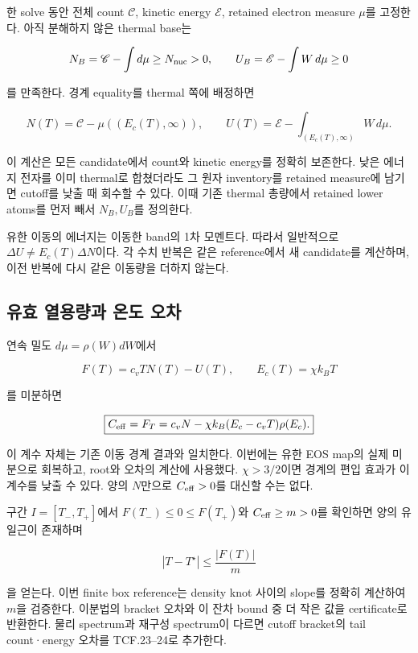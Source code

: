\documentclass[11pt,a4paper]{article}
\begin{document}
한 solve 동안 전체 count \(\mathscr C\), kinetic energy \(\mathscr E\), retained electron measure \(\mu\)를 고정한다. 아직 분해하지 않은 thermal base는

\[
N_B=\mathscr C-\int d\mu\ge N_{\rm nuc}>0,\qquad
U_B=\mathscr E-\int W\,d\mu\ge0
\]

를 만족한다. 경계 equality를 thermal 쪽에 배정하면

\[
\boxed{N(T)=\mathscr C-\mu((E_c(T),\infty)),\qquad
U(T)=\mathscr E-\int_{(E_c(T),\infty)}W\,d\mu.}
\]

이 계산은 모든 candidate에서 count와 kinetic energy를 정확히 보존한다. 낮은 에너지 전자를 이미 thermal로 합쳤더라도 그 원자 inventory를 retained measure에 남기면 cutoff를 낮출 때 회수할 수 있다. 이때 기존 thermal 총량에서 retained lower atoms를 먼저 빼서 \(N_B,U_B\)를 정의한다.

유한 이동의 에너지는 이동한 band의 1차 모멘트다. 따라서 일반적으로 \(\Delta U\ne E_c(T)\Delta N\)이다. 각 수치 반복은 같은 reference에서 새 candidate를 계산하며, 이전 반복에 다시 같은 이동량을 더하지 않는다.

\hypertarget{uxc720uxd6a8-uxc5f4uxc6a9uxb7c9uxacfc-uxc628uxb3c4-uxc624uxcc28}{%
\subsection{유효 열용량과 온도 오차}\label{uxc720uxd6a8-uxc5f4uxc6a9uxb7c9uxacfc-uxc628uxb3c4-uxc624uxcc28}}

연속 밀도 \(d\mu=\rho(W)dW\)에서

\[
F(T)=c_vTN(T)-U(T),\qquad E_c(T)=\chi k_BT
\]

를 미분하면

\[
\boxed{C_{\rm eff}=F_T=c_vN-\chi k_B(E_c-c_vT)\rho(E_c).}
\]

이 계수 자체는 기존 이동 경계 결과와 일치한다. 이번에는 유한 EOS map의 실제 미분으로 회복하고, root와 오차의 계산에 사용했다. \(\chi>3/2\)이면 경계의 편입 효과가 이 계수를 낮출 수 있다. 양의 \(N\)만으로 \(C_{\rm eff}>0\)를 대신할 수는 없다.

구간 \(I=[T_-,T_+]\)에서 \(F(T_-)\le0\le F(T_+)\)와 \(C_{\rm eff}\ge m>0\)를 확인하면 양의 유일근이 존재하며

\[
\boxed{|T-T^\star|\le\frac{|F(T)|}{m}}
\]

을 얻는다. 이번 finite box reference는 density knot 사이의 slope를 정확히 계산하여 \(m\)을 검증한다. 이분법의 bracket 오차와 이 잔차 bound 중 더 작은 값을 certificate로 반환한다. 물리 spectrum과 재구성 spectrum이 다르면 cutoff bracket의 tail count·energy 오차를 TCF.23--24로 추가한다.
\end{document}
